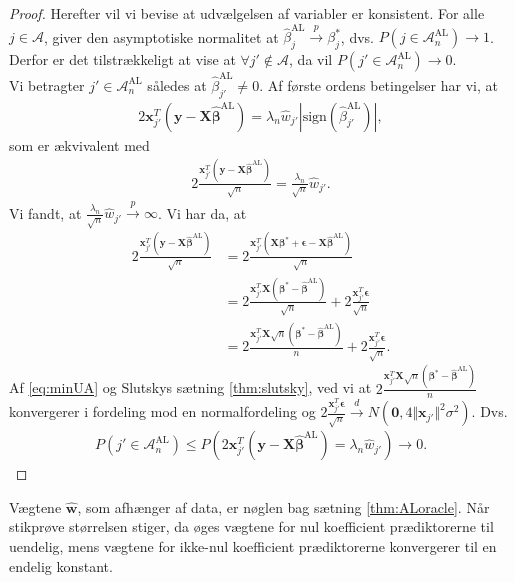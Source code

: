 \begin{proof}
Herefter vil vi bevise at udvælgelsen af variabler er konsistent. For alle $j \in \mathcal{A}$, giver den asymptotiske normalitet at $\hat{\beta}_j^{\text{AL}} \overset{p}{\rightarrow}\beta_j^{*}$, dvs. $P(j \in \mathcal{A}_n^{\text{AL}}) \rightarrow 1$. Derfor er det tilstrækkeligt at vise at $\forall j' \notin \mathcal{A}$, da vil $P(j' \in \mathcal{A}_n^{\text{AL}}) \rightarrow 0$. \\
Vi betragter $j' \in \mathcal{A}_n^{\text{AL}}$ således at $\hat{\beta}_{j'}^{\text{AL}} \neq 0$. Af første ordens betingelser har vi, at 
\begin{align*}
2 \mathbf{x}_{j'}^T  \left( \mathbf{y}-\mathbf{X}\hat{\boldsymbol{\beta}}^{\text{AL}} \right)=\lambda_n \hat{w}_{j'} \left\vert \text{sign}(\hat{\beta}_{j'}^\text{AL}) \right\vert,
\end{align*}
som er ækvivalent med
\begin{align*}
2 \frac{\mathbf{x}_{j'}^T \left( \mathbf{y}-\mathbf{X}\hat{\boldsymbol{\beta}}^{{\text{AL}}}\right)}{\sqrt{n}}=\frac{\lambda_n}{\sqrt{n}} \hat{w}_{j'}.
\end{align*}
Vi fandt, at $\frac{\lambda_n}{\sqrt{n}} \hat{w}_{j'} \overset{p}{\rightarrow} \infty$. Vi har da, at 
\begin{align*}
2 \frac{\mathbf{x}_{j'}^T \left(\mathbf{y}-\mathbf{X}\hat{\boldsymbol{\beta}}^{{\text{AL}}} \right)}{\sqrt{n}}
 &= 2 \frac{\mathbf{x}_{j'}^T \left(\mathbf{X}\boldsymbol{\beta}^*+\boldsymbol{\epsilon}-\mathbf{X}\hat{\boldsymbol{\beta}}^{{\text{AL}}} \right) }{\sqrt{n}} \\
&= 2 \frac{\mathbf{x}_{j'}^T \mathbf{X} \left(\boldsymbol{\beta}^*-\hat{\boldsymbol{\beta}}^{\text{AL}} \right)}{\sqrt{n}}+2\frac{\mathbf{x}_{j'}^T \boldsymbol{\epsilon}}{\sqrt{n}} \\
&= 2 \frac{\mathbf{x}_{j'}^T \mathbf{X} \sqrt{n} \left(\boldsymbol{\beta}^*-\hat{\boldsymbol{\beta}}^{\text{AL}}\right)}{n}+2\frac{\mathbf{x}_{j'}^T \boldsymbol{\epsilon}}{\sqrt{n}}.
\end{align*}
Af \eqref{eq:minUA} og Slutskys sætning \ref{thm:slutsky}, ved vi at $ 2 \frac{\mathbf{x}_{j'}^T \mathbf{X} \sqrt{n} \left(\boldsymbol{\beta}^*-\hat{\boldsymbol{\beta}}^{\text{AL}}\right)}{n}$ konvergerer i fordeling mod en normalfordeling og $2\frac{\mathbf{x}_{j'}^T \boldsymbol{\epsilon}}{\sqrt{n}} \overset{d}{\rightarrow} N \left(\mathbf{0}, 4 \Vert \mathbf{x}_{j'} \Vert^2 \sigma^2 \right)$. Dvs.
\begin{align*}
P\left(j' \in \mathcal{A}_n^{\text{AL}}\right) \leq P\left(2 \mathbf{x}_{j'}^T \left(\mathbf{y}-\mathbf{X} \hat{\boldsymbol{\beta}}^{\text{AL}}\right)=\lambda_n \hat{w}_{j'} \right) \rightarrow 0.
\end{align*}
\end{proof}
%
Vægtene \(\hat{\mathbf{w}}\), som afhænger af data, er nøglen bag sætning \ref{thm:ALoracle}.
Når stikprøve størrelsen stiger, da øges vægtene for nul koefficient prædiktorerne til uendelig, mens vægtene for ikke-nul koefficient prædiktorerne konvergerer til en endelig konstant.


